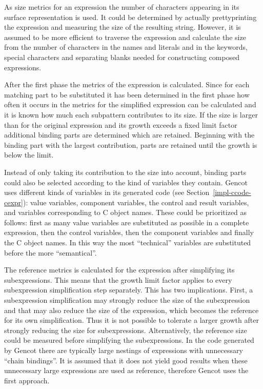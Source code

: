 As size metrics for an expression the number of characters appearing in its surface representation is used. It could be determined
by actually prettyprinting the expression and measuring the size of the resulting string. However, it is assumed to be more
efficient to traverse the expression and calculate the size from the number of characters in the names and literals and in
the keywords, special characters and separating blanks needed for constructing composed expressions.

After the first phase the metrics of the  expression is calculated. Since for each matching part to be substituted it 
has been determined in the first phase how often it occurs in  the metrics for the simplified expression can be 
calculated and it is known how much each subpattern contributes to its size. If the size is larger than for the original 
expression and its growth exceeds a fixed limit factor additional binding parts are determined which are retained. 
Beginning with the binding part with the largest contribution, parts are retained until the growth is below the limit.

Instead of only taking its contribution to the size into account, binding parts could also be selected according to the kind of
variables they contain. 
Gencot uses different kinds of variables in its generated code (see Section~\ref{impl-ccode-cexpr}): value variables, component
variables, the control and result variables, and variables corresponding to C object names. These could be prioritized
as follows: first as many value 
variables are substituted as possible in a complete expression, then the control variables, then the component variables and
finally the C object names. In this way the most ``technical'' variables are substituted before the more ``semantical''.

The reference metrics is calculated for the expression after simplifying its subexpressions. This means that the growth limit factor
applies to every subexpression simplification step separately. This has two implications. First, a subexpression simplification
may strongly reduce the size of the subexpression and that may also reduce the size of the  expression, which becomes 
the reference for its own simplification. Thus it is not possible to tolerate a larger growth after strongly reducing the size for
subexpressions. Alternatively, the reference size could be measured before simplifying the subexpressions. In the code generated
by Gencot there are typically large nestings of  expressions with unnecessary ``chain bindings''. It is assumed that it
does not yield good results when these unnecessary large expressions are used as reference, therefore Gencot uses the first approach.

